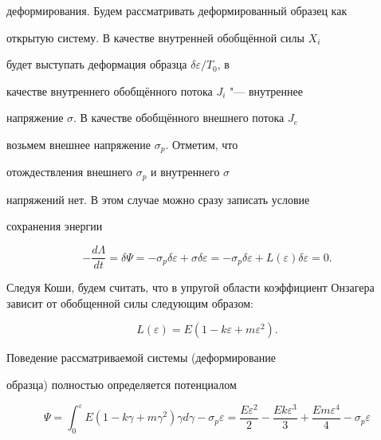деформирования. Будем рассматривать деформированный образец как

открытую систему. В качестве внутренней обобщённой силы $X_i$

будет выступать деформация образца $\delta \varepsilon / T_0$, в

качестве внутреннего обобщённого потока $J_i$ "--- внутреннее

напряжение $\sigma$. В качестве обобщённого внешнего потока $J_e$

возьмем внешнее напряжение $\sigma _p$. Отметим, что

отождествления внешнего $\sigma _p$ и внутреннего $\sigma$

напряжений нет. В этом случае можно сразу записать условие

сохранения энергии

\begin{equation*}

-\frac{d\Lambda }{dt} =\delta \Psi =-\sigma _p \delta \varepsilon

+ \sigma \delta \varepsilon =-\sigma_p \delta \varepsilon

+L(\varepsilon )\delta \varepsilon =0.

\end{equation*}

\noindent Следуя Коши, будем считать, что в упругой области коэффициент Онзагера зависит от обобщенной силы следующим образом:

\begin{equation}

L(\varepsilon)=E (1-k\varepsilon +m\varepsilon ^2).

\label{fedotov:ur0}

\end{equation}

\noindent Поведение рассматриваемой системы (деформирование

образца) полностью определяется потенциалом

\begin{equation}

\Psi =\int _{0}^{\varepsilon }E (1-k\gamma +m\gamma ^2 )\gamma

d\gamma  -\sigma _p \varepsilon =\frac{E\varepsilon ^2}{2}

-\frac{Ek\varepsilon^3}{3} +\frac{Em\varepsilon^4}{4} -\sigma_p

\varepsilon \label{fedotov:ur2}

\end{equation}

